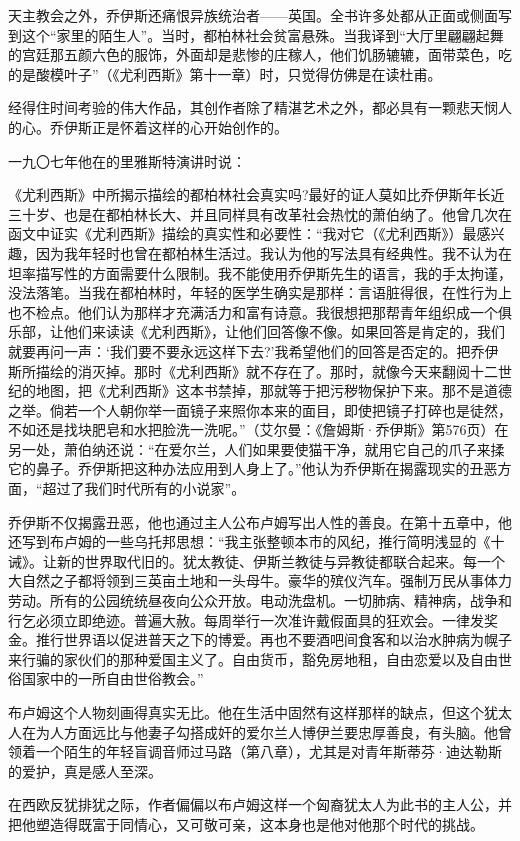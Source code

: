 \par 天主教会之外，乔伊斯还痛恨异族统治者——英国。全书许多处都从正面或侧面写到这个“家里的陌生人”。当时，都柏林社会贫富悬殊。当我译到“大厅里翩翩起舞的宫廷那五颜六色的服饰，外面却是悲惨的庄稼人，他们饥肠辘辘，面带菜色，吃的是酸模叶子”（《尤利西斯》第十一章）时，只觉得仿佛是在读杜甫。
\par 经得住时间考验的伟大作品，其创作者除了精湛艺术之外，都必具有一颗悲天悯人的心。乔伊斯正是怀着这样的心开始创作的。
\par 一九〇七年他在的里雅斯特演讲时说：
\par 《尤利西斯》中所揭示描绘的都柏林社会真实吗?最好的证人莫如比乔伊斯年长近三十岁、也是在都柏林长大、并且同样具有改革社会热忱的萧伯纳了。他曾几次在函文中证实《尤利西斯》描绘的真实性和必要性：“我对它（《尤利西斯》）最感兴趣，因为我年轻时也曾在都柏林生活过。我认为他的写法具有经典性。我不认为在坦率描写性的方面需要什么限制。我不能使用乔伊斯先生的语言，我的手太拘谨，没法落笔。当我在都柏林时，年轻的医学生确实是那样：言语脏得很，在性行为上也不检点。他们认为那样才充满活力和富有诗意。我很想把那帮青年组织成一个俱乐部，让他们来读读《尤利西斯》，让他们回答像不像。如果回答是肯定的，我们就要再问一声：‘我们要不要永远这样下去?’我希望他们的回答是否定的。把乔伊斯所描绘的消灭掉。那时《尤利西斯》就不存在了。那时，就像今天来翻阅十二世纪的地图，把《尤利西斯》这本书禁掉，那就等于把污秽物保护下来。那不是道德之举。倘若一个人朝你举一面镜子来照你本来的面目，即使把镜子打碎也是徒然，不如还是找块肥皂和水把脸洗一洗呢。”（艾尔曼：《詹姆斯·乔伊斯》第576页）在另一处，萧伯纳还说：“在爱尔兰，人们如果要使猫干净，就用它自己的爪子来揉它的鼻子。乔伊斯把这种办法应用到人身上了。”他认为乔伊斯在揭露现实的丑恶方面，“超过了我们时代所有的小说家”。
\par 乔伊斯不仅揭露丑恶，他也通过主人公布卢姆写出人性的善良。在第十五章中，他还写到布卢姆的一些乌托邦思想：“我主张整顿本市的风纪，推行简明浅显的《十诫》。让新的世界取代旧的。犹太教徒、伊斯兰教徒与异教徒都联合起来。每一个大自然之子都将领到三英亩土地和一头母牛。豪华的殡仪汽车。强制万民从事体力劳动。所有的公园统统昼夜向公众开放。电动洗盘机。一切肺病、精神病，战争和行乞必须立即绝迹。普遍大赦。每周举行一次准许戴假面具的狂欢会。一律发奖金。推行世界语以促进普天之下的博爱。再也不要酒吧间食客和以治水肿病为幌子来行骗的家伙们的那种爱国主义了。自由货币，豁免房地租，自由恋爱以及自由世俗国家中的一所自由世俗教会。”
\par 布卢姆这个人物刻画得真实无比。他在生活中固然有这样那样的缺点，但这个犹太人在为人方面远比与他妻子勾搭成奸的爱尔兰人博伊兰要忠厚善良，有头脑。他曾领着一个陌生的年轻盲调音师过马路（第八章），尤其是对青年斯蒂芬·迪达勒斯的爱护，真是感人至深。
\par 在西欧反犹排犹之际，作者偏偏以布卢姆这样一个匈裔犹太人为此书的主人公，并把他塑造得既富于同情心，又可敬可亲，这本身也是他对他那个时代的挑战。

